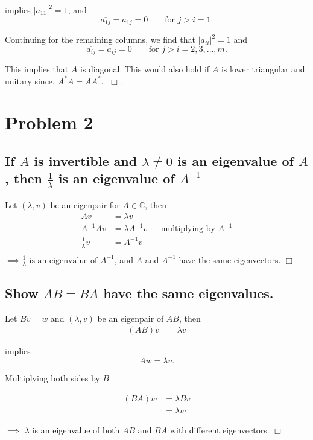 implies $|a_{11}|^2 = 1$, and
\[
\overline{a_{1j}} = a_{1j} = 0 \qquad \text{for } j > i = 1
.\] 

Continuing for the remaining columns, we find that $|a_{ii}|^2=1$ and
\[
\overline{a_{ij}} = a_{ij} = 0 \qquad \text{for } j > i = 2, 3, \dots, m
.\] 

This implies that $A$ is diagonal. This would also hold if $A$ is lower
triangular and unitary since, $A^{*}A = AA^{*}$. $\;\Box$. 

\section{Problem 2}%
\label{sec:problem_2}
\subsection{If $A$ is invertible and $\lambda \neq 0$ is an eigenvalue of $A$,
then $\frac{1}{\lambda }$ is an eigenvalue of $A^{-1}$}%
\label{sub:2.1}

Let $\left(\lambda, v\right)$ be an eigenpair for $A\in \mathbb{C}$, then
\begin{align*}
  Av &= \lambda v \\
  A^{-1} Av &= \lambda A^{-1}v && \text{multiplying by } A^{-1} \\
  \frac{1}{\lambda}v &= A^{-1}v \\
\end{align*}
$\implies \frac{1}{\lambda} \text{ is an eigenvalue of $A^{-1}$}$, and
$A$ and  $A^{-1}$ have the same eigenvectors. $\Box$

\subsection{Show $AB=BA$ have the same eigenvalues.}%
\label{sub:2.2}
Let $Bv = w$ and $ (\lambda ,v)$ be an eigenpair of $AB$, then
\begin{align*}
  \left(AB\right)v &= \lambda v
\end{align*}

implies
\[
Aw = \lambda v
.\] 

Multiplying both sides by $B$ 

\begin{align*}
    \left(BA\right)w &= \lambda Bv \\
          &= \lambda w
\end{align*}

$\implies$ $\lambda$ is an eigenvalue of both $AB$ and $BA$ with different
eigenvectors. $\Box$

